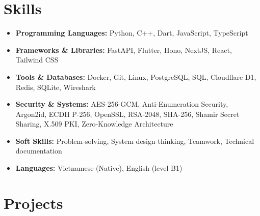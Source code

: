 \documentclass[10pt,a4paper]{article}
\begin{document}
\section*{Skills}
\begin{itemize}[leftmargin=0.15in, label={}, itemsep=0pt]
    \item \textbf{Programming Languages:} Python, C++, Dart, JavaScript, TypeScript
    \item \textbf{Frameworks \& Libraries:} FastAPI, Flutter, Hono, NextJS, React, Tailwind CSS
    \item \textbf{Tools \& Databases:} Docker, Git, Linux, PostgreSQL, SQL, Cloudflare D1, Redis, SQLite, Wireshark
    \item \textbf{Security \& Systems:} AES-256-GCM, Anti-Enumeration Security, Argon2id, ECDH P-256, OpenSSL, RSA-2048, SHA-256, Shamir Secret Sharing, X.509 PKI, Zero-Knowledge Architecture
    \item \textbf{Soft Skills:} Problem-solving, System design thinking, Teamwork, Technical documentation
    \item \textbf{Languages:} Vietnamese (Native), English (level B1)
\end{itemize}

\section*{Projects}
\end{document}
